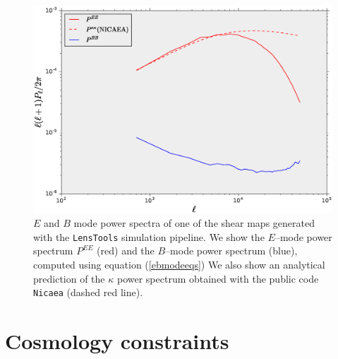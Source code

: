 \documentclass[reprint,aps,prd,superscriptaddress,showkeys,showpacs]{revtex4-1}
\newcommand{\ttt}[1]{\texttt{#1}}
\newcommand{\LT}{\texttt{LensTools} }
\begin{document}
\begin{figure}
\includegraphics[scale=0.3]{Figures/eb_modes.eps}
\caption{$E$ and $B$ mode power spectra of one of the shear maps generated with the \LT simulation pipeline. We show the $E$--mode power spectrum $P^{EE}$ (red) and the $B$--mode power spectrum (blue), computed using equation (\ref{ebmodeeqs}) We also show an analytical prediction of the $\kappa$ power spectrum obtained with the public code \ttt{Nicaea} (dashed red line).}
\label{ebmodefig}
\end{figure}



\section{Cosmology constraints}
\end{document}
